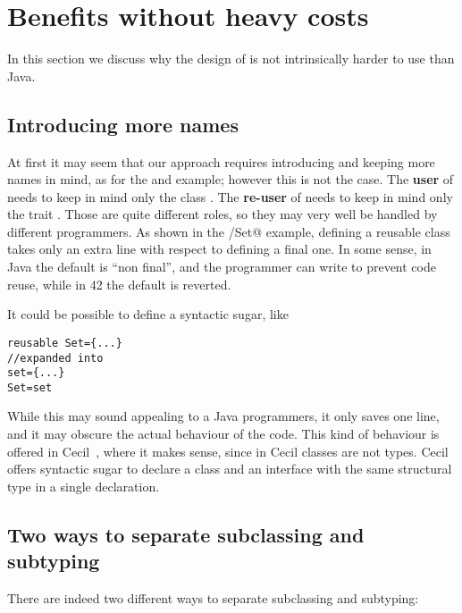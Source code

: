 \newpage\appendix



\section{Benefits without heavy costs}
In this section we discuss why the design of \name
is not intrinsically harder to use than Java.


\subsection{Introducing more names}
At first it may seem that our approach requires
introducing and keeping more names in mind, as for the \Q@set@ and \Q@Set@ example;
however this is not the case. 
The \textbf{user} of \Q@Set@ needs to keep in mind
only the class \Q@Set@.
The \textbf{re-user} of \Q@set@ needs to keep in mind only
 the trait \Q@set@.
Those are quite different roles, so they may very well
be handled by different programmers.
As shown in the \Q@set/Set@ example, defining a reusable class
takes only an extra line with respect to defining a final one.
In some sense, in Java the default is ``non final'', and
the programmer can write \Q@final@ to prevent code reuse, while
in 42 the default is reverted.

It could be possible to define a syntactic sugar, like
\begin{lstlisting}
reusable Set={...}
//expanded into
set={...}
Set=set
\end{lstlisting}
While this may sound appealing to a Java programmers, it only saves one line, and it may obscure the actual behaviour of the code.
This kind of behaviour is offered in Cecil~\cite{chambers1995typechecking}, where it makes sense, since in 
Cecil classes are not types.
Cecil offers syntactic sugar to declare a class and an
interface with the same structural type in a single declaration.

\subsection{Two ways to separate subclassing and subtyping}
There are indeed two different ways to separate subclassing and subtyping:

